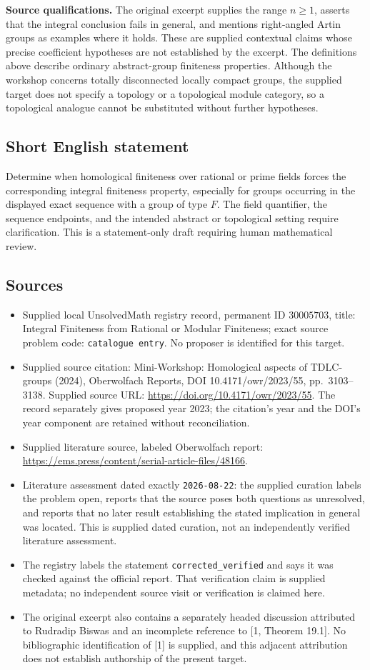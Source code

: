 \documentclass[11pt]{article}
\begin{document}
\textbf{Source qualifications.} The original excerpt supplies the range \(n\geq1\), asserts that the integral conclusion fails in general, and mentions right-angled Artin groups as examples where it holds. These are supplied contextual claims whose precise coefficient hypotheses are not established by the excerpt. The definitions above describe ordinary abstract-group finiteness properties. Although the workshop concerns totally disconnected locally compact groups, the supplied target does not specify a topology or a topological module category, so a topological analogue cannot be substituted without further hypotheses.
\subsection{Short English statement}
Determine when homological finiteness over rational or prime fields forces the corresponding integral finiteness property, especially for groups occurring in the displayed exact sequence with a group of type \(F\). The field quantifier, the sequence endpoints, and the intended abstract or topological setting require clarification. This is a statement-only draft requiring human mathematical review.
\subsection{Sources}
\begin{itemize}
\item Supplied local UnsolvedMath registry record, permanent ID \(30005703\), title: Integral Finiteness from Rational or Modular Finiteness; exact source problem code: \texttt{catalogue entry}. No proposer is identified for this target.
\item Supplied source citation: Mini-Workshop: Homological aspects of TDLC-groups (2024), Oberwolfach Reports, DOI 10.4171/owr/2023/55, pp.~3103--3138. Supplied source URL: \url{https://doi.org/10.4171/owr/2023/55}. The record separately gives proposed year 2023; the citation's year and the DOI's year component are retained without reconciliation.
\item Supplied literature source, labeled Oberwolfach report: \url{https://ems.press/content/serial-article-files/48166}.
\item Literature assessment dated exactly \texttt{2026-08-22}: the supplied curation labels the problem open, reports that the source poses both questions as unresolved, and reports that no later result establishing the stated implication in general was located. This is supplied dated curation, not an independently verified literature assessment.
\item The registry labels the statement \texttt{corrected\_verified} and says it was checked against the official report. That verification claim is supplied metadata; no independent source visit or verification is claimed here.
\item The original excerpt also contains a separately headed discussion attributed to Rudradip Biswas and an incomplete reference to [1, Theorem 19.1]. No bibliographic identification of [1] is supplied, and this adjacent attribution does not establish authorship of the present target.
\end{itemize}
\end{document}
